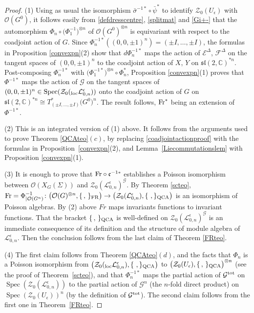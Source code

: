 \documentclass[pdftex]{sigma}%
\numberwithin{equation}{section}
\numberwithin{figure}{section}
\newcommand{\e}{\epsilon}
\newcommand{\mc}{\mathbb{C}}
\newcommand{\Gg}{{\mathcal G}}
\newcommand{\Ll}{{\mathcal L}}
\newcommand{\ra}{\rightarrow}
\begin{document}
\begin{proof} (1) Using as usual the isomorphism $\bar \sigma^{-1*}\circ \bar{\psi}^*$ to identify $\mathcal{Z}_0(U_\epsilon)$ with $\mathcal{O}(G^0)$, it follows easily from \eqref{defdresscentre}, \eqref{splitmat} and \eqref{Gi+-} that the automorphism $\Phi_n\circ \big(\Phi_1^{-1}\big)^{\otimes n}$ of $\mathcal{O}(G^0)^{\otimes n}$ is equi\-va\-riant with respect to the coadjoint action of $G$. Since $\Phi_n^{-1*}((0,0,\pm 1)^n) = (\pm I,\dots,\pm I)$, the formulas in Proposition \ref{convexpn}(2) show that $d\Phi_n^{-1*}$ maps the action of ${\mathcal E}^{\Delta}$, ${\mathcal F}^{\Delta}$ on the tangent spaces of $(0,0,\pm 1)^n$ to the coadjoint action of $X$, $Y$ on ${\mathfrak{sl}}(2,\mc)^{*n}$. Post-composing $\Phi_n^{-1*}$ with $\big(\Phi_1^{-1*}\big)^{\otimes n}\circ \Phi_n^*$, Proposition \ref{convexpn}(1) proves that $\Phi^{-1*}$ maps the action of $\Gg$ on the tangent spaces of $(0,0,\pm 1)^n \in \operatorname{Spec}(\mathcal{Z}_0({}_{\rm loc}\Ll_{0,n}^\epsilon))$ onto the coadjoint action of $G$ on ${\mathfrak{sl}}(2,\mc)^{*n} \cong T_{(\pm I,\dots,\pm I)}^*\big(G^0\big)^n$. The result follows, ${\rm Fr}^*$ being an extension of $\Phi^{-1*}$.

(2) This is an integrated version of (1) above. It follows from the arguments used to prove Theorem \ref{QCAteo}$(c)$, by replacing \eqref{coadjointactionproof} with the formulas in Proposition~\ref{convexpn}(2), and Lemma~\ref{Liecommutationslem} with Proposition \ref{convexpn}(1).

(3) It is enough to prove that ${\rm Fr}\circ \mathfrak{c}^{-1*}$ establishes a Poisson isomorphism between $\mathcal{O}(X_G(\Sigma))$ and $\mathcal{Z}_0(\Ll_{0,n}^\epsilon)^{\mathcal{G}}$. By Theorem \ref{scteo}, ${\rm Fr} = \Phi^{-1}_{\vert \mathcal{O}(G^n)} \colon \big(\mathcal{O}(G)^{\otimes n},\{\, ,\, \}_{\rm FR}\big) \ra \big(\mathcal{Z}_0(\Ll_{0,n}^\epsilon),\{\ ,\}_{\rm QCA}\big)$ is an isomorphism of Poisson algebras. By (2) above $Fr$ maps invariants functions to invariant functions. That the bracket $\{\, ,\, \}_{\rm QCA}$ is well-defined on $\mathcal{Z}_0(\Ll_{0,n}^\epsilon)^{\mathcal{G}}$ is an immediate consequence of its definition and the structure of module algebra of $\Ll_{0,n}^\epsilon$. Then the conclusion follows from the last claim of Theorem \ref{FRteo}.

(4) The first claim follows from Theorem \ref{QCAteo}$(d)$, and the facts that $\Phi_n$ is a Poisson isomorphism from $\big(\mathcal{Z}_0({}_{\rm loc}\Ll_{0,n}^\epsilon),\{\ ,\}_{\rm QCA}\big)$ to $\big(\mathcal{Z}_0(U_\epsilon),\{\, ,\, \}_{\rm QCA}\big)^{\otimes n}$ (see the proof of Theorem~\ref{scteo}), and that $\Phi_n^{-1*}$ maps the partial action of $\Gg^{\rm tot}$ on $\operatorname{Spec}(\mathcal{Z}_0(\Ll_{0,n}^\e))$ to the partial action of $\Gg^{n}$ (the $n$-fold direct product) on $\operatorname{Spec}(\mathcal{Z}_0(U_\epsilon))^n$ (by the definition of $\Gg^{\rm tot}$). The second claim follows from the first one in Theorem~\ref{FRteo}.
\end{proof}
\end{document}
